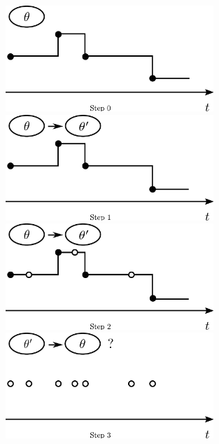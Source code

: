 \setlength{\unitlength}{0.8cm}
  \begin{figure}[h!]
  \centering
  \begin{minipage}[!hp]{0.45\linewidth}
  \centering
    \includegraphics [width=0.70\textwidth, angle=0]{figs/plot0.pdf}
      \end{minipage}
  \begin{minipage}[hp]{0.45\linewidth}
  \centering
    \includegraphics [width=0.70\textwidth, angle=0]{figs/plot1.pdf}
    \vspace{-0 in}
  \end{minipage}
  \begin{minipage}[hp]{0.45\linewidth}
  \centering
    \includegraphics [width=0.70\textwidth, angle=0]{figs/plot2.pdf}
    \vspace{-0 in}
  \end{minipage}
  \begin{minipage}[hp]{0.45\linewidth}
  \centering
    \includegraphics [width=0.70\textwidth, angle=0]{figs/plot3.pdf}

\end{minipage}
\end{figure}
